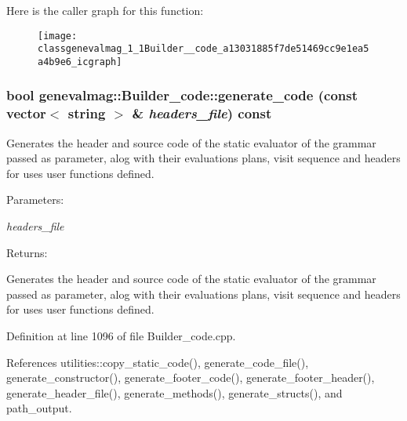 Here is the caller graph for this function:\nopagebreak
\begin{figure}[H]
\begin{center}
\leavevmode
\texttt{[image: classgenevalmag\_1\_1Builder\_\_code\_a13031885f7de51469cc9e1ea5a4b9e6\_icgraph]}
\end{center}
\end{figure}
\hypertarget{classgenevalmag_1_1Builder__code_9f79ad68269841d1149eeca4a19b4747}{
\subsubsection[{generate\_\-code}]{\setlength{\rightskip}{0pt plus 5cm}bool genevalmag::Builder\_\-code::generate\_\-code (const vector$<$ string $>$ \& {\em headers\_\-file}) const}}
\label{classgenevalmag_1_1Builder__code_9f79ad68269841d1149eeca4a19b4747}


Generates the header and source code of the static evaluator of the grammar passed as parameter, alog with their evaluations plans, visit sequence and headers for uses user functions defined. \begin{Desc}
\item[Parameters:]
\begin{description}
\item[{\em headers\_\-file}]\end{description}
\end{Desc}
\begin{Desc}
\item[Returns:]\end{Desc}
Generates the header and source code of the static evaluator of the grammar passed as parameter, alog with their evaluations plans, visit sequence and headers for uses user functions defined. 

Definition at line 1096 of file Builder\_\-code.cpp.

References utilities::copy\_\-static\_\-code(), generate\_\-code\_\-file(), generate\_\-constructor(), generate\_\-footer\_\-code(), generate\_\-footer\_\-header(), generate\_\-header\_\-file(), generate\_\-methods(), generate\_\-structs(), and path\_\-output.

